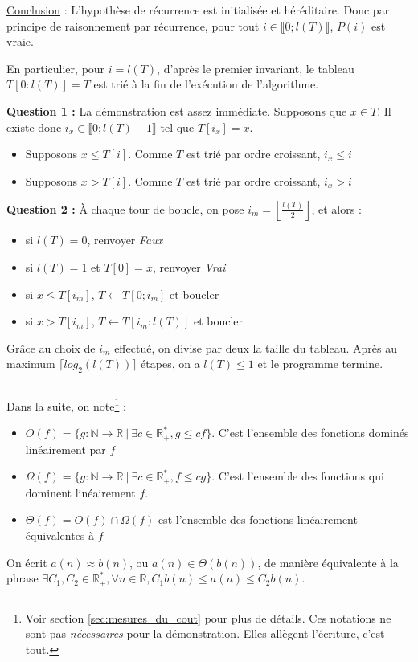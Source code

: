 \documentclass[../main.tex]{subfiles}
\begin{document}
\underline{Conclusion} : L'hypothèse de récurrence est initialisée et héréditaire. Donc par principe de raisonnement par récurrence, pour tout $i\in\llbracket 0; l(T)\rrbracket$, $P(i)$ est vraie.

En particulier, pour $i = l(T)$, d'après le premier invariant, le tableau $T[0:l(T)] = T$ est trié à la fin de l'exécution de l'algorithme.


\textbf{Question 1 :} La démonstration est assez immédiate. Supposons que $x\in T$. Il existe donc $i_x\in \llbracket{0; l(T)-1}\rrbracket$ tel que $T[i_x] = x$. 
\begin{itemize}
	\item Supposons $x\leq T[i]$. Comme $T$ est trié par ordre croissant, $i_x \leq i$
	\item Supposons $x > T[i]$. Comme $T$ est trié par ordre croissant, $i_x > i$ 
\end{itemize}
\textbf{Question 2 :} À chaque tour de boucle, on pose $i_m = \left\lfloor \frac{l(T)}{2}\right\rfloor$, et alors :
\begin{itemize}
	\item si $l(T) = 0$, renvoyer \textit{Faux}
	\item si $l(T) = 1$ et $T[0] = x$, renvoyer \textit{Vrai}
	\item si $x\leq T[i_m]$, $T\leftarrow T[0; i_m]$ et boucler
	\item si $x > T[i_m]$, $T\leftarrow T[i_m:l(T)]$ et boucler
\end{itemize}
Grâce au choix de $i_m$ effectué, on divise par deux la taille du tableau. Après au maximum $\lceil log_2(l(T))\rceil$ étapes, on a $l(T) \leq 1$ et le programme termine.
\inputminted{c}{solutions/part2/chapter2/dichotomique.c}

Dans la suite, on note\footnote{Voir section \ref{sec:mesures_du_cout} pour plus de détails. Ces notations ne sont pas \textit{nécessaires} pour la démonstration. Elles allègent l'écriture, c'est tout.} :
\begin{itemize}
	\item $O(f) = \{g:\mathbb{N}\rightarrow\mathbb{R}\ |\ \exists c\in\mathbb{R}_+^{*}, g\leq cf\}$.\newline
	C'est l'ensemble des fonctions dominés linéairement par $f$
	\item $\Omega(f) = \{g:\mathbb{N}\rightarrow \mathbb{R}\ |\ \exists c\in\mathbb{R}_+^*, f\leq cg\}$.\newline
	C'est l'ensemble des fonctions qui dominent linéairement $f$.
	\item $\Theta(f) = O(f)\cap \Omega(f)$ est l'ensemble des fonctions linéairement équivalentes à $f$
\end{itemize}
On écrit $a(n)\approx b(n)$, ou $a(n)\in\Theta(b(n))$, de manière équivalente à la phrase $\exists C_1, C_2\in\mathbb{R_+^*}, \forall n\in\mathbb{R}, C_1b(n) \leq a(n) \leq C_2b(n)$. 
\end{document}

